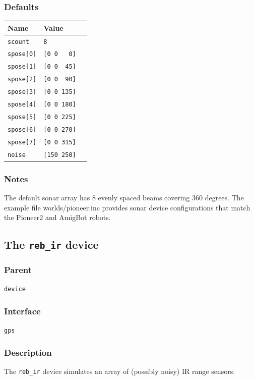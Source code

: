 \documentclass[11pt,twoside]{report}
\begin{document}
\subsubsection*{Defaults}
\begin{tabularx}{\columnwidth}{llX}
\hline
Name & Value\\
\hline
\verb'scount' & \verb'8'\\
\verb'spose[0]' & \verb'[0 0   0]'\\
\verb'spose[1]' & \verb'[0 0  45]'\\
\verb'spose[2]' & \verb'[0 0  90]'\\
\verb'spose[3]' & \verb'[0 0 135]'\\
\verb'spose[4]' & \verb'[0 0 180]'\\
\verb'spose[5]' & \verb'[0 0 225]'\\
\verb'spose[6]' & \verb'[0 0 270]'\\
\verb'spose[7]' & \verb'[0 0 315]'\\
\verb'noise' & \verb'[150 250]'\\
\hline
\end{tabularx}

\subsubsection*{Notes}
The default sonar array has 8 evenly spaced beams covering 360
degrees. The example file worlds/pioneer.inc provides sonar device
configurations that match the Pioneer2 and AmigBot robots.

\newpage
\subsection{The {\tt reb\_ir} device}

\subsubsection*{Parent}
{\tt device}

\subsubsection*{Interface}
{\tt gps}

\subsubsection*{Description}
The {\tt reb\_ir} device simulates an array of (possibly noisy) IR range sensors.
\end{document}
